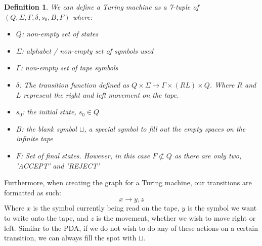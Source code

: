 \documentclass[12pt, letterpaper]{article}
\newtheorem*{defn}{Definition}
\begin{document}
\begin{defn}
We can define a Turing machine as a 7-tuple of $(Q, \Sigma, \Gamma, \delta, s_0, B, F)$ where:
\begin{itemize}
\item $Q$: non-empty set of states
\item $\Sigma$: alphabet / non-empty set of symbols used
\item $\Gamma$: non-empty set of tape symbols
\item $\delta$: The transition function defined as $Q \times \Sigma \rightarrow \Gamma \times (RL) \times Q$. Where $R$ and $L$ represent the right and left movement on the tape.
\item $s_0$: the initial state, $s_0 \in Q$
\item $B$: the blank symbol $\sqcup$, a special symbol to fill out the empty spaces on the infinite tape
\item $F$: Set of final states. However, in this case $F \not \subset Q$ as there are only two, 'ACCEPT' and 'REJECT'
\end{itemize}
\end{defn}
Furthermore, when creating the graph for a Turing machine, our transitions are formatted as such:
\[ x \rightarrow y, z \]
Where $x$ is the symbol currently being read on the tape, $y$ is the symbol we want to write onto the tape, and $z$ is the movement, whether we wish to move right or left. Similar to the PDA, if we do not wish to do any of these actions on a certain transition, we can always fill the spot with $\sqcup$.
\end{document}
